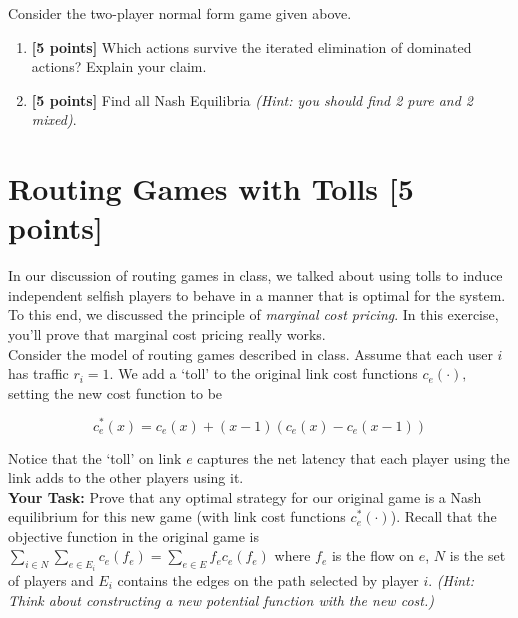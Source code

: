 \documentclass[11pt]{article}
\begin{document}
\noindent Consider the two-player normal form game given above.

\begin{enumerate}[label=(\alph*)]
\item \textbf{[5 points]} Which actions survive the iterated elimination of dominated actions? Explain your claim.

\item \textbf{[5 points]} Find all Nash Equilibria \textit{(Hint: you should find 2 pure and 2 mixed)}.
\end{enumerate}

\section{Routing Games with Tolls [5 points]}

In our discussion of routing games in class, we talked about using tolls to induce independent selfish players to behave in a manner that is optimal for the system. To this end, we discussed the principle of \emph{marginal cost pricing}. In this exercise, you'll prove that marginal cost pricing really works.\\

\noindent Consider the model of routing games described in class. Assume that each user $i$ has traffic $r_i = 1.$ We add a `toll' to the original link cost functions $c_e(\cdot),$ setting the new cost function to be

$$c^*_e(x) = c_e(x) + (x-1)\left(c_e(x) - c_e(x-1)\right)$$

\noindent Notice that the `toll' on link $e$ captures the net latency that each player using the link adds to the other players using it.\\


\noindent \textbf{Your Task: } Prove that any optimal strategy for our original game is a Nash equilibrium for this new game (with link cost functions $c^*_e(\cdot)$). Recall that the objective function in the original game is $\sum_{i \in N}\sum_{e \in E_i}c_e(f_e)=\sum_{e \in E} f_e c_e(f_e)$ where $f_e$ is the flow on $e$, $N$ is the set of players and $E_i$ contains the edges on the path selected by player $i$. \textit{(Hint: Think about constructing a new potential function with the new cost.)}
\end{document}
